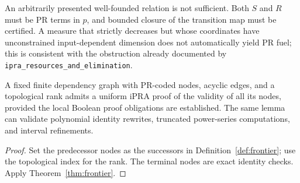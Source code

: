 \documentclass[11pt]{article}
\begin{document}
\begin{remark}
An arbitrarily presented well-founded relation is not sufficient. Both \(S\) and \(R\) must be PR terms in \(p\), and bounded closure of the transition map must be certified. A measure that strictly decreases but whose coordinates have unconstrained input-dependent dimension does not automatically yield PR fuel; this is consistent with the obstruction already documented by \texttt{ipra\_resources\_and\_elimination}.
\end{remark}
\begin{corollary}
A fixed finite dependency graph with PR-coded nodes, acyclic edges, and a topological rank admits a uniform iPRA proof of the validity of all its nodes, provided the local Boolean proof obligations are established. The same lemma can validate polynomial identity rewrites, truncated power-series computations, and interval refinements.
\end{corollary}
\begin{proof}Set the predecessor nodes as the successors in Definition~\ref{def:frontier}; use the topological index for the rank. The terminal nodes are exact identity checks. Apply Theorem~\ref{thm:frontier}.\end{proof}
\end{document}
